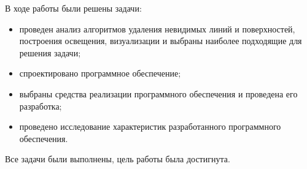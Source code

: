 
В ходе работы были решены задачи:
\begin{itemize}
	\item проведен анализ алгоритмов  удаления невидимых линий и поверхностей, построения освещения, визуализации и выбраны наиболее подходящие для решения задачи;
	\item спроектировано программное обеспечение;
	\item выбраны средства реализации программного обеспечения и проведена его разработка;
	\item проведено исследование характеристик разработанного программного обеспечения.
\end{itemize}

Все задачи были выполнены, цель работы была достигнута.